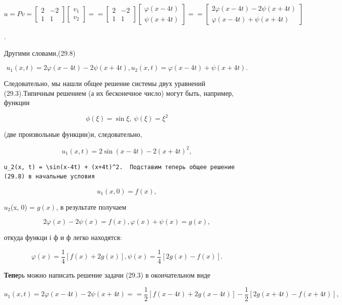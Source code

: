 \documentclass[
  ukrainian,
]{article}
\begin{document}
\[
u = Pv =
\begin{bmatrix} 2 & -2 \\ 1 & 1 \end{bmatrix}
\begin{bmatrix} v_1 \\ v_2 \end{bmatrix}
=
=
\begin{bmatrix} 2 & -2 \\ 1 & 1 \end{bmatrix}
\begin{bmatrix} \varphi(x - 4t) \\ \psi(x + 4t) \end{bmatrix}
=
=
\begin{bmatrix} 2\varphi(x - 4t) - 2\psi(x + 4t) \\ \varphi(x - 4t) + \psi(x + 4t) \end{bmatrix}
\]

.

Другими словами,(29.8)

\[
u_1(x, t) = 2\varphi(x-4t) - 2\psi(x+4t), u_2(x, t) = \varphi(x-4t) + \psi(x+4t).
\]

Следовательно, мы нашли общее решение системы двух уравнений
(29.3).Типичным решением (а их бесконечное число) могут быть, например,
функции

\[
\phi(\xi) = \sin \xi, \ \psi(\xi) = \xi^2
\]

(две произвольные функции)и, следовательно,

\[
u_1(x, t) = 2 \sin(x-4t) - 2(x+4t)^2,
\]

\begin{verbatim}
u_2(x, t) = \sin(x-4t) + (x+4t)^2.  Подставим теперь общее решение (29.8) в начальные условия
\end{verbatim}

\[
u_1(x, 0) = f(x),
\]

\(u_2\)(x, 0) = \(g(x)\), в результате получаем

\[
2\varphi(x) - 2\psi(x) = f(x),
\varphi(x) + \psi(x) = g(x),
\]

откуда функци і ф и ф легко находятся:

\[
\varphi(x) = \frac{1}{4} \left[ f(x) + 2g(x) \right],
\psi(x) = \frac{1}{4} \left[ 2g(x) - f(x) \right].
\]

\textbf{Тепе}рь можно написать решение задачи (29.3) в окончательном
виде

\[
u_{1}(x, t) = 2\varphi(x-4t) - 2\psi(x+4t) =
= \frac{1}{2} \left[ f(x-4t) + 2g(x-4t) \right] - \frac{1}{2} \left[ 2g(x+4t) - f(x+4t) \right],
\]
\end{document}
